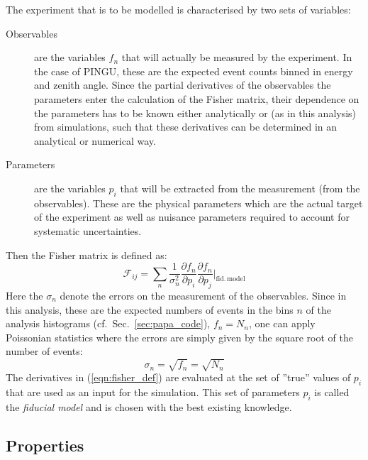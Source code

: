 The experiment that is to be modelled is characterised by two sets of variables:
\begin{description}
 \item[Observables] are the variables $f_n$ that will actually be measured by
  the experiment. In the case of PINGU, these are the expected event counts 
  binned in energy and zenith angle. Since the partial derivatives of the
  observables \wrt the parameters enter the calculation of the Fisher matrix,
  their dependence on the parameters has to be known either analytically or (as
  in this analysis) from simulations, such that these derivatives can be
  determined in an analytical or numerical way.
 \item[Parameters] are the variables $p_i$ that will be extracted from the
  measurement (\ie from the observables). These are the physical parameters
  which are the actual target of the experiment as well as nuisance parameters
  required to account for systematic uncertainties.
\end{description}
Then the Fisher matrix is defined as:
\begin{equation}
 \mathcal{F}_{ij} = \sum_n \frac{1}{\sigma_n^2} \frac{\partial f_n}{\partial
p_i} \frac{\partial f_n}
 {\partial p_j}\bigg|_\mathrm{fid.\,model}
 \label{eqn:fisher_def}
\end{equation}
Here the $\sigma_n$ denote the errors on the measurement of the observables.
Since in this analysis, these are the expected numbers of events in the bins $n$
of the analysis histograms (cf.\ Sec.~\ref{sec:papa_code}), $f_n = N_n$, one
can apply Poissonian statistics where the errors are simply given by the square
root of the number of events:
\begin{equation}
 \sigma_n = \sqrt{f_n} = \sqrt{N_n}
\end{equation}
The derivatives in (\ref{eqn:fisher_def}) are evaluated at the set of ''true''
values of $p_i$ that are used as an input for the simulation. This set of
parameters $p_i$ is called the \emph{fiducial model} and is chosen with the best
existing knowledge.

\subsection{Properties}

